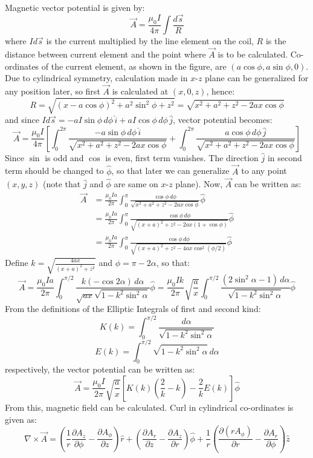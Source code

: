 \documentclass[12pt]{article}
\begin{document}
Magnetic vector potential is given by:
$$ \vec{A}=\frac{\mu_0I}{4\pi}\int \frac{d\vec{s}}{R} $$
where $Id\vec{s}$ is the current multiplied by the line element on the coil, $R$ is the distance between current element and the point where $\vec{A}$ is to be calculated. Co-ordinates of the current element, as shown in the figure, are $(a\cos\phi,a\sin\phi,0)$. Due to cylindrical symmetry, calculation made in $x$-$z$ plane can be generalized for any position later, so first $\vec{A}$ is calculated at $\left(x,0,z\right)$, hence:
$$ R=\sqrt{(x-a\cos\phi)^2+a^2\sin^2\phi+z^2}=\sqrt{x^2+a^2+z^2-2ax\cos\phi} $$
and since $Id\vec{s}=-aI\sin\phi\,d\phi\,\hat{i}+aI\cos\phi\,d\phi\,\hat{j}$, vector potential becomes:
$$ \vec{A}=\frac{\mu_0I}{4\pi}\left[\int_{0}^{2\pi} \frac{-a\sin\phi\,d\phi\,\hat{i}}{\sqrt{x^2+a^2+z^2-2ax\cos\phi}}+\int_{0}^{2\pi} \frac{a\cos\phi\,d\phi\,\hat{j}}{\sqrt{x^2+a^2+z^2-2ax\cos\phi}}\right] $$
Since $\sin$ is odd and $\cos$ is even, first term vanishes. The direction $\hat{j}$ in second term should be changed to $\hat\phi$, so that later we can generalize $\vec{A}$ to any point $(x,y,z)$ (note that $\hat{j}$ and $\hat\phi$ are same on $x$-$z$ plane). Now, $\vec{A}$ can be written as:
\begin{align}\vec{A} &= \frac{\mu_0Ia}{2\pi}\int_0^\pi \frac{\cos\phi\,d\phi}{\sqrt{x^2+a^2+z^2-2ax\cos\phi}}\hat\phi \nonumber \\
&= \frac{\mu_0Ia}{2\pi}\int_0^\pi \frac{\cos\phi\,d\phi}{\sqrt{(x+a)^2+z^2-2ax(1+\cos\phi)}}\hat\phi \nonumber \\
&= \frac{\mu_0Ia}{2\pi}\int_0^\pi \frac{\cos\phi\,d\phi}{\sqrt{(x+a)^2+z^2-4ax\cos^2(\phi/2)}}\hat\phi \nonumber \end{align}
Define $k=\sqrt{\frac{4ax}{(x+a)^2+z^2}}$ and $\phi=\pi-2\alpha$, so that:
$$ \vec{A}=\frac{\mu_0Ia}{2\pi}\int_0^{\pi/2} \frac{k\left(-\cos2\alpha\right)\,d\alpha}{\sqrt{ax}\sqrt{1-k^2\sin^2\alpha}}\hat\phi = \frac{\mu_0Ik}{2\pi}\sqrt{\frac{a}{x}}\int_0^{\pi/2} \frac{\left(2\sin^2\alpha-1\right)\,d\alpha}{\sqrt{1-k^2\sin^2\alpha}}\hat\phi $$
From the definitions of the Elliptic Integrals of first and second kind:
$$ K\left(k\right)=\int_0^{\pi/2}\frac{d\alpha}{\sqrt{1-k^2\sin^2\alpha}} $$
$$ E\left(k\right)=\int_0^{\pi/2}\sqrt{1-k^2\sin^2\alpha}\,d\alpha $$
respectively, the vector potential can be written as:
$$ \vec{A}=\frac{\mu_0I}{2\pi}\sqrt{\frac{a}{x}}\left[K(k)\left( \frac{2}{k}-k \right) -\frac{2}{k}E(k) \right]\hat\phi $$
From this, magnetic field can be calculated. Curl in cylindrical co-ordinates is given as:
$$ \nabla\times\vec{A}=\left(\frac{1}{r}\frac{\partial A_z}{\partial\phi}-\frac{\partial A_\phi}{\partial z}\right)\hat{r}+\left(\frac{\partial A_r}{\partial z}-\frac{\partial A_z}{\partial r}\right)\hat{\phi}+\frac{1}{r}\left(\frac{\partial(rA_\phi)}{\partial r}-\frac{\partial A_r}{\partial\phi}\right)\hat{z} $$
\end{document}
